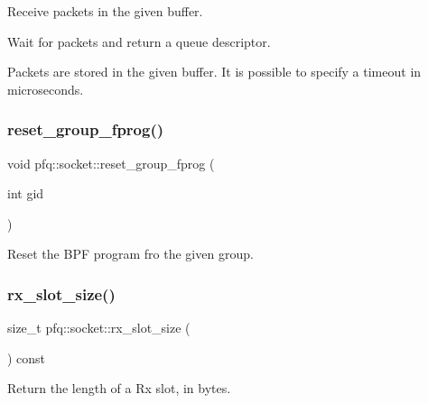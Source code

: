 Receive packets in the given buffer. 

Wait for packets and return a queue descriptor.

Packets are stored in the given buffer. It is possible to specify a timeout in microseconds. \mbox{\label{classpfq_1_1socket_a2327e71a6f94e54efb0da5ec36b1c620}} 
\subsubsection{\texorpdfstring{reset\+\_\+group\+\_\+fprog()}{reset\_group\_fprog()}}
{\footnotesize\ttfamily void pfq\+::socket\+::reset\+\_\+group\+\_\+fprog (\begin{DoxyParamCaption}\item[{int}]{gid }\end{DoxyParamCaption})\hspace{0.3cm}{\ttfamily [inline]}}



Reset the B\+PF program fro the given group. 

\mbox{\label{classpfq_1_1socket_ac46fe8e1ba3313003dc3e4ee1411ef63}} 
\subsubsection{\texorpdfstring{rx\+\_\+slot\+\_\+size()}{rx\_slot\_size()}}
{\footnotesize\ttfamily size\+\_\+t pfq\+::socket\+::rx\+\_\+slot\+\_\+size (\begin{DoxyParamCaption}{ }\end{DoxyParamCaption}) const\hspace{0.3cm}{\ttfamily [inline]}}



Return the length of a Rx slot, in bytes. 

\mbox{\label{classpfq_1_1socket_a5cf700fc12d67b91df3d669ac4aa737a}} 
